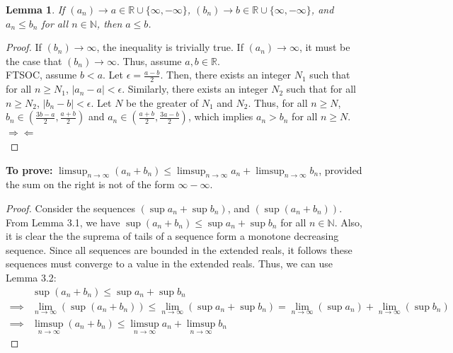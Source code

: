 \documentclass[12pt]{article}
\newtheorem{lemma}[theorem]{Lemma}
\begin{document}
\begin{lemma}If $(a_{n})\to a\in \mathbb{R}\cup \{ \infty, -\infty \}$, $(b_{n})\to b\in \mathbb{R}\cup \{ \infty, -\infty \}$, and $a_{n}\le b_{n}$ for all $n\in \mathbb{N}$, then $a\le b$. \end{lemma}

\begin{proof}
      If $(b_{n})\to \infty$, the inequality is trivially true.
      If $(a_{n}) \to \infty$, it must be the case that $(b_{n})\to \infty$. Thus, assume
      $a, b\in \mathbb{R}$. \\
      FTSOC, assume $b<a$. Let $\epsilon = \frac{{a-b}}{2}$. Then, there exists an
      integer $N_{1}$ such that for all $n\ge N_{1}$, $|a_{n}-a|<\epsilon$. Similarly,
      there exists an integer $N_{2}$ such that for all $n\ge N_{2}$, $|b_{n}-b|<\epsilon$.
      Let $N$ be the greater of $N_{1}$ and $N_{2}$. Thus, for all
      $n\ge N$, $b_{n} \in \left( \frac{{3b-a}}{2}, \frac{{a+b}}{2} \right)$ and
      $a_{n}\in \left( \frac{{a+b}}{2}, \frac{{3a-b}}{2} \right)$, which implies
      $a_{n}> b_{n}$ for all $n\ge N$. \hfill $\Rightarrow\Leftarrow$\\
\end{proof}

{\bf To prove: }$\limsup_{ n \to \infty }(a_{n}+ b_{n})\le \limsup_{ n \to \infty}a_{n}+\limsup_{ n \to \infty } b_{n}$,
provided the sum on the right is not of the form $\infty-\infty$.

\begin{proof}
      Consider the sequences $(\sup a_{n}+\sup b_{n})$, and $(\sup(a_{n}+b_{n}))$. From Lemma 3.1,
      we have $\sup(a_{n}+b_{n})\le \sup a_{n}+ \sup b_{n}$ for all $n\in \mathbb{N}$.
      Also, it is clear the the suprema of tails of a sequence form a monotone decreasing sequence.
      Since all sequences are bounded in the extended reals, it follows these sequences must
      converge to a value in the extended reals. Thus, we can use Lemma 3.2:
      \begin{align*}
                     & \sup(a_{n}+b_{n})\le \sup a_{n}+ \sup b_{n}                                                                                                                          \\
            \implies & \lim_{ n \to \infty } (\sup(a_{n}+b_{n}))\le \lim_{ n \to \infty } (\sup a_{n}+ \sup b_{n}) = \lim_{ n \to \infty } (\sup a_{n})+ \lim_{ n \to \infty } (\sup b_{n}) \\
            \implies & \limsup_{ n \to \infty }(a_{n}+ b_{n})\le \limsup_{ n \to \infty}a_{n}+\limsup_{ n \to \infty } b_{n}
      \end{align*}
\end{proof}
\end{document}
